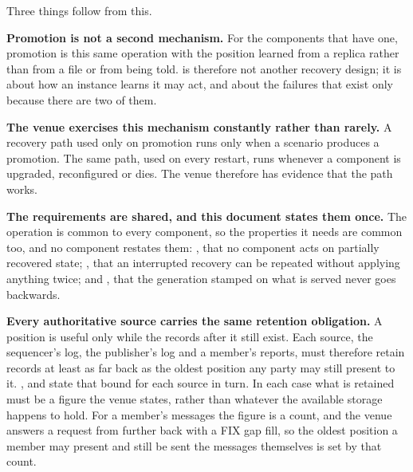 Three things follow from this.

\textbf{Promotion is not a second mechanism.} For the components that have one,
promotion is this same operation with the position learned from a replica rather
than from a file or from being told.  is therefore not
another recovery design; it is about how an instance learns it may act, and about
the failures that exist only because there are two of them.

\textbf{The venue exercises this mechanism constantly rather than rarely.} A
recovery path used only on promotion runs only when a scenario produces a
promotion. The same path, used on every restart, runs whenever a component is
upgraded, reconfigured or dies. The venue therefore has evidence that the path
works.

\textbf{The requirements are shared, and this document states them once.} The
operation is common to every component, so the properties it needs are common
too, and no component restates them: , that no component acts on
partially recovered state; , that an interrupted recovery can be
repeated without applying anything twice; and , that the
generation stamped on what is served never goes backwards.

\textbf{Every authoritative source carries the same retention obligation.} A
position is useful only while the records after it still exist. Each source, the
sequencer's log, the publisher's log and a member's reports, must therefore
retain records at least as far back as the oldest position any party may still
present to it. ,  and  state that
bound for each source in turn. In each case what is retained must be a figure
the venue states, rather than whatever the available storage happens to hold.
For a member's messages the figure is a count, and the venue answers a request
from further back with a FIX gap fill, so the oldest position a member may present
and still be sent the messages themselves is set by that count.

